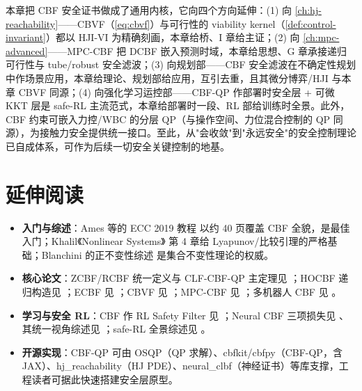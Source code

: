 本章把 CBF 安全证书做成了通用内核，它向四个方向延伸：(1) 向 \cref{ch:hj-reachability}——CBVF（\cref{eq:cbvf}）与可行性的 viability kernel（\cref{def:control-invariant}）都以 HJI-VI 为精确刻画，本章给桥、I 章给主证；(2) 向 \cref{ch:mpc-advanced}——MPC-CBF 把 DCBF 嵌入预测时域，本章给思想、G 章承接递归可行性与 tube/robust 安全滤波；(3) 向规划部——CBF 安全滤波在不确定性规划中作场景应用，本章给理论、规划部给应用，互引去重，且其微分博弈/HJI 与本章 CBVF 同源；(4) 向强化学习运控部——CBF-QP 作部署时安全层 + 可微 KKT 层是 safe-RL 主流范式，本章给部署时一段、RL 部给训练时全景。此外，CBF 约束可嵌入力控/WBC 的分层 QP（与操作空间、力位混合控制的 QP 同源），为接触力安全提供统一接口。至此，从"会收敛"到"永远安全"的安全控制理论已自成体系，可作为后续一切安全关键控制的地基。

\section*{延伸阅读}

\begin{itemize}
\item \textbf{入门与综述}：Ames 等的 ECC 2019 教程 \cite{ames2019cbf} 以约 40 页覆盖 CBF 全貌，是最佳入门；Khalil《Nonlinear Systems》\cite{khalil2002nonlinear} 第 4 章给 Lyapunov/比较引理的严格基础；Blanchini 的正不变性综述 \cite{blanchini1999survey} 是集合不变性理论的权威。
\item \textbf{核心论文}：ZCBF/RCBF 统一定义与 CLF-CBF-QP 主定理见 \cite{ames2017cbf}；HOCBF 递归构造见 \cite{xiao2022hocbf}；ECBF 见 \cite{nguyen2016ecbf}；CBVF 见 \cite{choi2021cbvf}；MPC-CBF 见 \cite{zeng2021mpccbf}；多机器人 CBF 见 \cite{wang2017safety}。
\item \textbf{学习与安全 RL}：CBF 作 RL Safety Filter 见 \cite{cheng2019rlcbf}；Neural CBF 三项损失见 \cite{dawson2021safe}、其统一视角综述见 \cite{dawson2023survey}；safe-RL 全景综述见 \cite{brunke2022safe}。
\item \textbf{开源实现}：CBF-QP 可由 OSQP（QP 求解）、cbfkit/cbfpy（CBF-QP，含 JAX）、hj\_reachability（HJ PDE）、neural\_clbf（神经证书）等库支撑，工程读者可据此快速搭建安全层原型。
\end{itemize}

